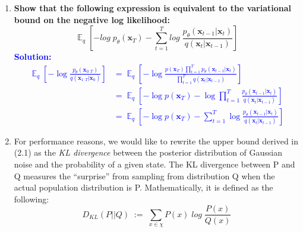 \documentclass{article}
\DeclareMathOperator{\EX}{\mathbb{E}}%
\begin{document}
\begin{enumerate}
\item
\textbf{Show that the following expression is equivalent to the variational bound on the negative log likelihood:}
\begin{equation}
    \EX_q\left[-log \; p_{\theta}(\textbf{x}_T) - \sum_{t=1}^{T} log\;\frac{p_{\theta}(\textbf{x}_{t-1}|\textbf{x}_t)}{q(\textbf{x}_t|\textbf{x}_{t-1})} \right]
\end{equation}
\textcolor{blue}{
    \textbf{Solution: } 
    \begin{align*}
        \EX_q\left[-\log\frac{p_\theta(\textbf{x}_{0:T})}{q(\textbf{x}_{1:T}|\textbf{x}_0)}\right]
        &= \EX_q\left[-\log\frac{p(\textbf{x}_T)\displaystyle\prod_{t=1}^{T}
        p_\theta(\textbf{x}_{t-1}|\textbf{x}_t)}{\displaystyle\prod_{t=1}^{T}q(\textbf{x}_t|\textbf{x}_{t-1})}\right] \\
        &= \EX_q\left[-\log{p(\textbf{x}_T)} - \log\displaystyle\prod_{t=1}^{T}{
        \frac{p_\theta(\textbf{x}_{t-1}|\textbf{x}_t)}{q(\textbf{x}_t|\textbf{x}_{t-1})}}\right] \\
        &= \EX_q\left[-\log{p(\textbf{x}_T)} - \sum_{t=1}^{T}{\log
        \frac{p_\theta(\textbf{x}_{t-1}|\textbf{x}_t)}{q(\textbf{x}_t|\textbf{x}_{t-1})}}\right]
    \end{align*}
}
\item
For performance reasons, we would like to rewrite the upper bound derived in (2.1) as the \textit{KL divergence} between the posterior distribution of Gaussian noise and the probability of a given state. The KL divergence between P and Q measures the ``surprise'' from sampling from distribution Q when the actual population distribution is P. Mathematically, it is defined as the following:
\begin{equation}
    D_{KL}(P||Q) \; := \;\sum_{x\in\chi}P(x)\;log\;\frac{P(x)}{Q(x)}
\end{equation}


\end{enumerate}
\end{document}
